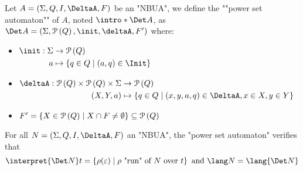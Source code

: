 \documentclass[a4paper,UKenglish,cleveref, autoref, thm-restate]{lipics-v2021}
\begin{document}
\begin{definition}
	\AP Let $A = \NBUA$ be an "NBUA", we define the ""power set automaton"" of $A$, noted $\intro* \Det A$, as
	$\Det A = (\Sigma, \parts Q, \init, \deltaA, F')$ where:

	\begin{itemize}
		\item $\begin{aligned}[t]
				      \init      : \Sigma & \to \parts Q                              \\
				      a                   & \mapsto \setdef{q \in Q}{(a,q) \in \Init}
			      \end{aligned} $

		\item $\begin{aligned}[t]
				      \deltaA               : \parts Q \times \parts Q \times \Sigma & \to \parts Q                                                      \\
				      (X, Y, a)                                                      & \mapsto \setdef{q \in Q}{(x,y,a,q) \in \DeltaA, x \in X, y \in Y}
			      \end{aligned}$

		\item $F' = \left\{X \in \mathcal{P}\left(Q\right) \mid X \cap F \neq \emptyset\right\} \subseteq \mathcal{P}\left(Q\right)$
	\end{itemize}
\end{definition}

\begin{theorem}
	For all $N = \NBUA$ an "NBUA", the "power set automaton" verifies that
	\[
		\interpret {\Det N} t = \setdef {\rho(\varepsilon)}{\text{$\rho$ "run" of~$N$ over~$t$}} \text{ and } \lang N = \lang {\Det N}
	\]
\end{theorem}
\end{document}
